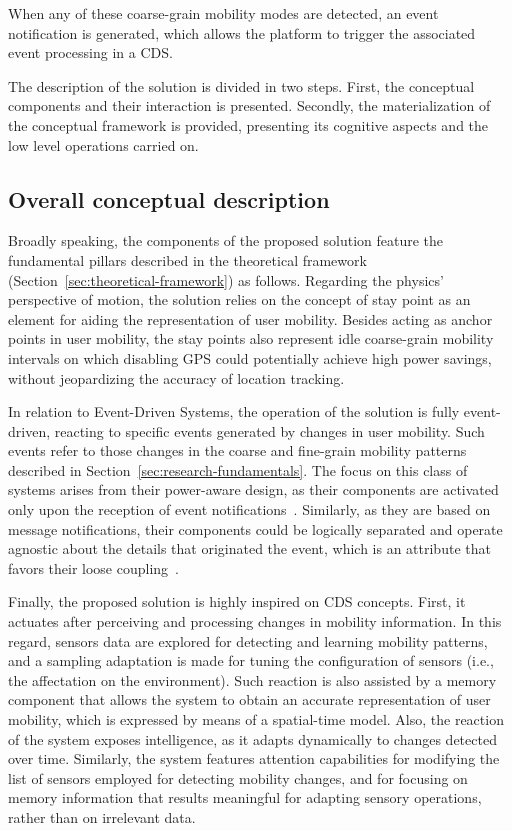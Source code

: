 \documentclass[ENG,PhD]{cinvestav}
\begin{document}
When any of these coarse-grain mobility modes are detected, an event notification is generated, which allows the platform to trigger the associated event processing in a CDS.

The description of the solution is divided in two steps.
First, the conceptual components and their interaction is presented.
Secondly, the materialization of the conceptual framework is provided, presenting its cognitive aspects and the low level operations carried on.

\subsection{Overall conceptual description}
Broadly speaking, the components of the proposed solution feature the fundamental pillars described in the theoretical framework (Section~\ref{sec:theoretical-framework}) as follows.
Regarding the physics' perspective of motion, the solution relies on the concept of stay point as an element for aiding the representation of user mobility. 
Besides acting as anchor points in user mobility, the stay points also represent idle coarse-grain mobility intervals on which disabling GPS could potentially achieve high power savings, without jeopardizing the accuracy of location tracking.

In relation to Event-Driven Systems, the operation of the solution is fully event-driven, reacting to specific events generated by changes in user mobility.
Such events refer to those changes in the coarse and fine-grain mobility patterns described in Section~\ref{sec:research-fundamentals}.
The focus on this class of systems arises from their power-aware design, as their components are activated only upon the reception of event notifications~\cite{Rawassizadeh2015,Lee2015,Duffy2007}.
Similarly, as they are based on message notifications, their components could be logically separated and operate agnostic about the details that originated the event, which is an attribute that favors their loose coupling~\cite{Faison2011,Etzion2011}.

Finally, the proposed solution is highly inspired on CDS concepts. 
First, it actuates after perceiving and processing changes in mobility information.
In this regard, sensors data are explored for detecting and learning mobility patterns, and a sampling adaptation is made for tuning the configuration of sensors (i.e., the affectation on the environment).
Such reaction is also assisted by a memory component that allows the system to obtain an accurate representation of user mobility, which is expressed by means of a spatial-time model.
Also, the reaction of the system exposes intelligence, as it adapts dynamically to changes detected over time.
Similarly, the system features attention capabilities for modifying the list of sensors employed for detecting mobility changes, and for focusing on memory information that results meaningful for adapting sensory operations, rather than on irrelevant data.
\end{document}

